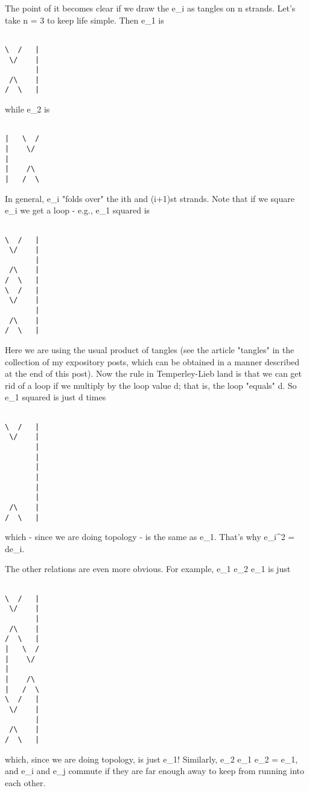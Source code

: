 The point of it becomes clear if we draw the e_i as tangles on n
strands.  Let's take n = 3 to keep life simple.  Then e_1 is


\begin{verbatim}

\  /   |
 \/    |
       |
 /\    |
/  \   |
\end{verbatim}
    

while e_2 is


\begin{verbatim}

|   \  /  
|    \/   
|      
|    /\   
|   /  \  
\end{verbatim}
    

In general, e_i "folds over" the ith and (i+1)st strands.  Note that if
we square e_i we get a loop - e.g., e_1 squared is


\begin{verbatim}

\  /   |
 \/    |
       |
 /\    |
/  \   |
\  /   |
 \/    |
       |
 /\    |
/  \   |
\end{verbatim}
    

Here we are using the usual product of tangles (see the article "tangles"
in the collection of my expository posts, which can be obtained in a
manner described at the end of this post).  Now the rule in
Temperley-Lieb land is that we can get rid of a loop if we multiply by
the loop value d; that is, the loop "equals" d.  So e_1 squared is just
d times



\begin{verbatim}

\  /   |
 \/    |
       |
       |
       |
       |
       |
       |
 /\    |
/  \   |
\end{verbatim}
    

which - since we are doing topology - is the same as e_1.  That's why 
e_i^2 = de_i.  

The other relations are even more obvious.  For example, e_1 e_2 e_1 is
just


\begin{verbatim}

\  /   |
 \/    |
       |
 /\    |
/  \   |
|   \  /  
|    \/   
|      
|    /\   
|   /  \  
\  /   |
 \/    |
       |
 /\    |
/  \   |
\end{verbatim}
    

which, since we are doing topology, is just e_1!  Similarly, e_2 e_1 e_2
= e_1, and e_i and e_j commute if they are far enough away to keep from
running into each other.

